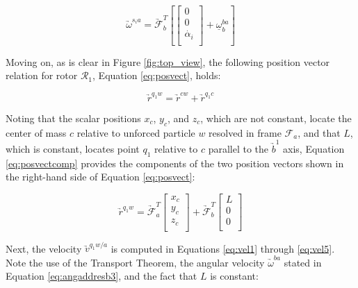 \documentclass[journal]{IEEEtran}
\begin{document}
\begin{equation}
\underrightarrow{\omega}^{s_ia}=\underrightarrow{\mathcal{F}}^T_b[\left[ \begin{array}{c}
		0  \\
		0 \\
		\dot{\alpha_i} \\
		\end{array} \right]+\underline{\omega}^{ba}_b]
\label{eq:angvelsia2}
\end{equation} 

Moving on, as is clear in Figure \ref{fig:top_view}, the following position vector relation for rotor $\mathcal{R}_1$, Equation \ref{eq:posvect}, holds:

\begin{equation}
	\underrightarrow{r}^{q_1w}=	\underrightarrow{r}^{cw}+	\underrightarrow{r}^{q_1c}
	\label{eq:posvect}
\end{equation}

Noting that the scalar positions $x_c$, $y_c$, and $z_c$, which are not constant, locate the center of mass $c$ relative to unforced particle $w$ resolved in frame $\mathcal{F}_a$, and that $L$, which is constant, locates point $q_1$ relative to $c$ parallel to the $\underrightarrow{b}^1$ axis, Equation \ref{eq:posvectcomp} provides the components of the two position vectors shown in the right-hand side of Equation \ref{eq:posvect}:

\begin{equation}
	\underrightarrow{r}^{q_1w}=\underrightarrow{\mathcal{F}}^T_a
		\left[ \begin{array}{c}
		x_c \\
		y_c \\
		z_c \\
		\end{array} \right]+\underrightarrow{\mathcal{F}}^T_b
				\left[ \begin{array}{c}
				L \\
				0 \\
				0 \\
				\end{array} \right]			
	\label{eq:posvectcomp}
\end{equation}

Next, the velocity $\underrightarrow{v}^{q_1w/a}$ is computed in Equations \ref{eq:vel1} through \ref{eq:vel5}. Note the use of the Transport Theorem, the angular velocity $\underrightarrow{\omega}^{ba}$ stated in Equation \ref{eq:angaddresb3}, and the fact that $L$ is constant:
\end{document}
